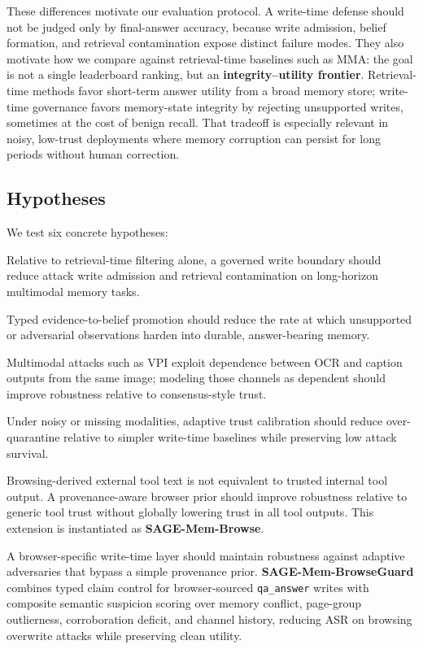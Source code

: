 \documentclass{article}
\begin{document}
These differences motivate our evaluation protocol. A write-time defense should not be judged only by final-answer accuracy, because write admission, belief formation, and retrieval contamination expose distinct failure modes. They also motivate how we compare against retrieval-time baselines such as MMA: the goal is not a single leaderboard ranking, but an \textbf{integrity--utility frontier}. Retrieval-time methods favor short-term answer utility from a broad memory store; write-time governance favors memory-state integrity by rejecting unsupported writes, sometimes at the cost of benign recall. That tradeoff is especially relevant in noisy, low-trust deployments where memory corruption can persist for long periods without human correction.

\subsection{Hypotheses}

We test six concrete hypotheses:

\begin{description}[style=nextline,leftmargin=0pt,labelsep=0.4em,font=\normalfont\bfseries]
\item[H1: Write-time governance hypothesis.] Relative to retrieval-time filtering alone, a governed write boundary should reduce attack write admission and retrieval contamination on long-horizon multimodal memory tasks.
\item[H2: Belief-formation hypothesis.] Typed evidence-to-belief promotion should reduce the rate at which unsupported or adversarial observations harden into durable, answer-bearing memory.
\item[H3: Dependent-evidence hypothesis.] Multimodal attacks such as VPI exploit dependence between OCR and caption outputs from the same image; modeling those channels as dependent should improve robustness relative to consensus-style trust.
\item[H4: Noise-calibration hypothesis.] Under noisy or missing modalities, adaptive trust calibration should reduce over-quarantine relative to simpler write-time baselines while preserving low attack survival.
\item[H5: Browsing-context prior hypothesis.] Browsing-derived external tool text is not equivalent to trusted internal tool output. A provenance-aware browser prior should improve robustness relative to generic tool trust without globally lowering trust in all tool outputs. This extension is instantiated as \textbf{SAGE-Mem-Browse}.
\item[H6: Browsing-guard hypothesis.] A browser-specific write-time layer should maintain robustness against adaptive adversaries that bypass a simple provenance prior. \textbf{SAGE-Mem-BrowseGuard} combines typed claim control for browser-sourced \texttt{qa\_answer} writes with composite semantic suspicion scoring over memory conflict, page-group outlierness, corroboration deficit, and channel history, reducing ASR on browsing overwrite attacks while preserving clean utility.
\end{description}
\end{document}
